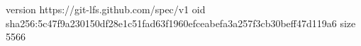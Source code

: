 version https://git-lfs.github.com/spec/v1
oid sha256:5c47f9a230150df28e1c51fad63f1960efceabefa3a257f3cb30beff47d119a6
size 5566
